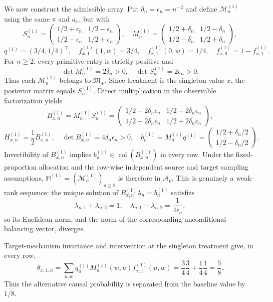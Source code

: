 We now construct the admissible array.  Put \(\delta_n=\epsilon_n=n^{-2}\) and define \(\mathcal M_n^{(1)}\) using the same \(\pi\) and \(a_x\), but with
\[
S_n^{(1)}=
\begin{pmatrix}
1/2+\epsilon_n&1/2-\epsilon_n\\
1/2-\epsilon_n&1/2+\epsilon_n
\end{pmatrix},\quad
M_n^{(1)}=
\begin{pmatrix}
1/2+\delta_n&1/2-\delta_n\\
1/2-\delta_n&1/2+\delta_n
\end{pmatrix},
\]
\[
q^{(1)}=(3/4,1/4)^{\top},\quad
f^{(1)}_{x,1}(1,w)=3/4,\quad
f^{(1)}_{x,1}(0,w)=1/4,\quad
f^{(1)}_{x,0}=1-f^{(1)}_{x,1}.
\]
For \(n\ge2\), every primitive entry is strictly positive and
\[
\det M_n^{(1)}=2\delta_n>0,
\quad
\det S_n^{(1)}=2\epsilon_n>0.
\]
Thus each \(\mathcal M_n^{(1)}\) belongs to \(\mathfrak M_{+}\).  Since treatment is the singleton value \(x\), the posterior matrix equals \(S_n^{(1)}\).  Direct multiplication in the observable factorization yields
\[
B_{x,n}^{(1)}=M_n^{(1)}S_n^{(1)}=
\begin{pmatrix}
1/2+2\delta_n\epsilon_n&1/2-2\delta_n\epsilon_n\\
1/2-2\delta_n\epsilon_n&1/2+2\delta_n\epsilon_n
\end{pmatrix},
\]
\[
H_{x,n}^{(1)}=\frac12B_{x,n}^{(1)},\quad
\det B_{x,n}^{(1)}=4\delta_n\epsilon_n>0,
\quad
b_n^{(1)}=M_n^{(1)}q^{(1)}=
\begin{pmatrix}1/2+\delta_n/2\\1/2-\delta_n/2\end{pmatrix}.
\]
Invertibility of \(B_{x,n}^{(1)}\) implies
\(b_n^{(1)}\in\operatorname{col}(B_{x,n}^{(1)})\) in every row.  Under the fixed-proportion allocation and the row-wise independent source and target sampling assumptions, \(\mathbb M^{(1)}=(\mathcal M_n^{(1)})_{n\ge2}\) is therefore in \(\mathcal A_p\).  This is genuinely a weak-rank sequence: the unique solution of \(B_{x,n}^{(1)}\lambda_n=b_n^{(1)}\) satisfies
\[
\lambda_{n,1}+\lambda_{n,2}=1,
\quad
\lambda_{n,1}-\lambda_{n,2}=\frac1{4\epsilon_n},
\]
so its Euclidean norm, and the norm of the corresponding unconditional balancing vector, diverges.

Target-mechanism invariance and intervention at the singleton treatment give, in every row,
\[
\theta_{x,1,n}
=\sum_{u,w}q_u^{(1)}M_n^{(1)}(w,u)f^{(1)}_{x,1}(u,w)
=\frac34\frac34+\frac14\frac14
=\frac58.
\]
Thus the alternative causal probability is separated from the baseline value by \(1/8\).

